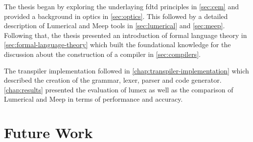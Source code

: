 The thesis began by exploring the underlaying \gls{fdtd} principles in \cref{sec:cem} and provided a background in optics in \cref{sec:optics}. This followed by a detailed description of Lumerical and Meep tools in \cref{sec:lumerical} and \cref{sec:meep}. Following that, the thesis presented an introduction of formal language theory in \cref{sec:formal-language-theory} which built the foundational knowledge for the discussion about the construction of a compiler in \cref{sec:compilers}.


The transpiler implementation followed in \cref{chap:transpiler-implementation} which described the creation of the grammar, lexer, parser and code generator. \cref{chap:results} presented the evaluation of \gls{lumex} as well as the comparison of Lumerical and Meep in terms of performance and accuracy. 



\section{Future Work}


